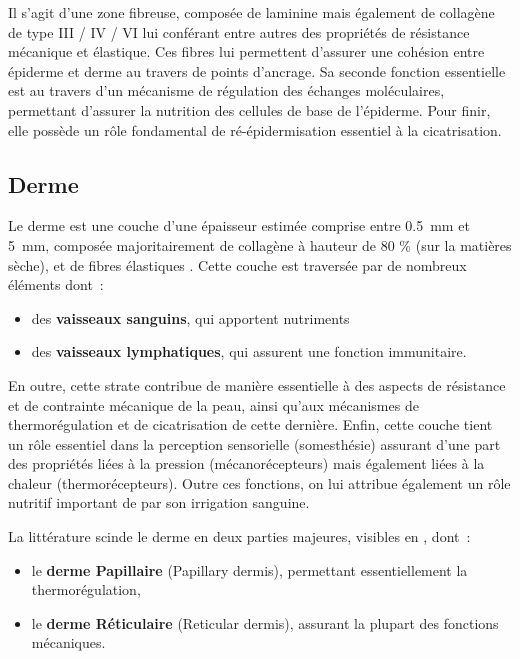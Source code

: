 Il s’agit d’une zone fibreuse, composée de laminine mais également de collagène de type III / IV / VI lui conférant entre autres des propriétés de résistance mécanique et élastique. Ces fibres lui permettent d’assurer une cohésion entre épiderme et derme au travers de points d’ancrage. Sa seconde fonction essentielle est au travers d’un mécanisme de régulation des échanges moléculaires, permettant d’assurer la nutrition des cellules de base de l’épiderme. Pour finir, elle possède un rôle fondamental de ré-épidermisation essentiel à la cicatrisation.\par
\clearpage

\subsection{Derme}
Le derme est une couche d’une épaisseur estimée comprise entre \SI{0,5}{\milli\metre} et \SI{5}{\milli\metre}, composée majoritairement de collagène à hauteur de 80 \% (sur la matières sèche), et de fibres élastiques \cite{McGrath2010}. Cette couche est traversée par de nombreux éléments dont~:~

\begin{itemize}
    \item des \textbf{vaisseaux sanguins}, qui apportent nutriments
    \item des \textbf{vaisseaux lymphatiques}, qui assurent une fonction immunitaire.
\end{itemize}\par

En outre, cette strate contribue de manière essentielle à des aspects de résistance et de contrainte mécanique de la peau, ainsi qu’aux mécanismes de thermorégulation et de cicatrisation de cette dernière. Enfin, cette couche tient un rôle essentiel dans la perception sensorielle (somesthésie) assurant d’une part des propriétés liées à la pression (mécanorécepteurs) mais également liées à la chaleur (thermorécepteurs). Outre ces fonctions, on lui attribue également un rôle nutritif important de par son irrigation sanguine.\par

La littérature scinde le derme en deux parties majeures, visibles en , dont~:
\begin{itemize}
    \item le \textbf{derme Papillaire} (Papillary dermis), permettant essentiellement la thermorégulation,
    \item le \textbf{derme Réticulaire} (Reticular dermis), assurant la plupart des fonctions mécaniques.
\end{itemize}\par

